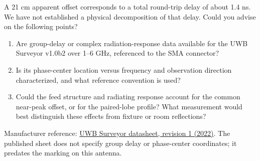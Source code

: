 \documentclass[11pt,a4paper]{article}
\begin{document}
A 21 cm apparent offset corresponds to a total round-trip delay of about
1.4 ns. We have not established a physical decomposition of that delay.
Could you advise on the following points?
\begin{enumerate}
\item Are group-delay or complex radiation-response data available for the
UWB Surveyor v1.0b2 over 1--6 GHz, referenced to the SMA connector?
\item Is its phase-center location versus frequency and observation direction
characterized, and what reference convention is used?
\item Could the feed structure and radiating response account for the common
near-peak offset, or for the paired-lobe profile? What measurement would best
distinguish these effects from fixture or room reflections?
\end{enumerate}
\noindent Manufacturer reference:
\href{https://www.nooelec.com/store/downloads/dl/file/id/110/product/339/uwb_surveyor_datasheet_revision_1.pdf}{UWB Surveyor datasheet, revision 1 (2022)}.
The published sheet does not specify group delay or phase-center coordinates;
it predates the marking on this antenna.
\end{document}
